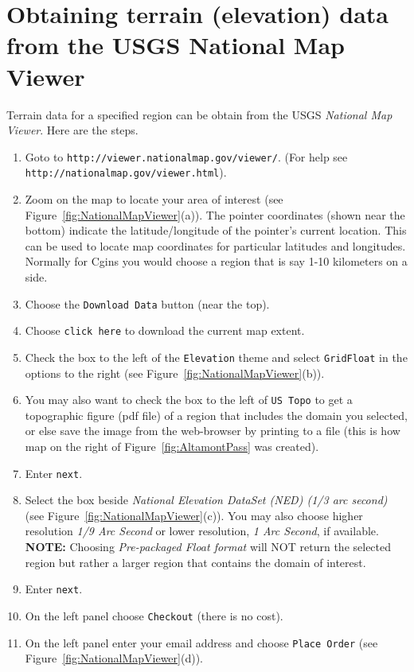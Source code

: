 \documentclass[11pt]{article}
\begin{document}
\section{Obtaining terrain (elevation) data from the USGS National Map Viewer} \label{sec:NationalMapViewer}


 Terrain data for a specified region can be obtain from the USGS
{\em National Map Viewer}. Here are the steps.

\begin{enumerate}
  \item Goto to {\tt http://viewer.nationalmap.gov/viewer/}. (For help see {\tt http://\-nationalmap.gov/\-viewer.html}).
  \item Zoom on the map to locate your area of interest (see Figure~\ref{fig:NationalMapViewer}(a)). The pointer coordinates
(shown near the bottom) indicate the latitude/longitude of the pointer's current
location. This can be used to locate map coordinates for particular
latitudes and longitudes. Normally for Cgins you would choose a region that is
say 1-10 kilometers on a side.
  \item Choose the {\tt Download Data} button (near the top).
  \item Choose {\tt click here} to download the current map extent.
  \item Check the box to the left of the {\tt Elevation} theme and select {\tt GridFloat} in the options to the right (see Figure~\ref{fig:NationalMapViewer}(b)). 
  \item You may also want to check the box to the left of {\tt US Topo} to get a topographic figure (pdf file) of a region that 
    includes the domain you selected,
    or else save the image from the web-browser by printing to a file (this is how map on the right of Figure~\ref{fig:AltamontPass} was created).
  \item Enter {\tt next}.
  \item Select the box beside {\em National Elevation DataSet (NED) (1/3 arc second)} (see Figure~\ref{fig:NationalMapViewer}(c)).  
        You may also choose higher resolution {\em 1/9 Arc Second} or lower resolution, {\em 1 Arc Second}, if available. {\bf NOTE:} Choosing {\em Pre-packaged Float format} will NOT return the selected region
      but rather a larger region that contains the domain of interest. 
   \item Enter {\tt next}.
   \item On the left panel choose {\tt Checkout} (there is no cost).
   \item On the left panel enter your email address and choose {\tt Place Order} (see Figure~\ref{fig:NationalMapViewer}(d)).

\end{enumerate}
\end{document}
